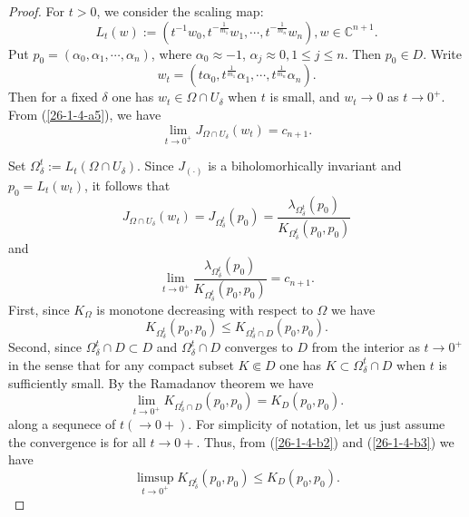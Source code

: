 \documentclass[a4paper,centertags,oneside,12pt]{amsart}
\numberwithin{equation}{section}
\begin{document}
\begin{proof}
For $t>0$, we consider the scaling map:
\begin{equation*}
    L_t(w):=(t^{-1}w_0, t^{-\frac{1}{m_1}}w_1, \cdots, t^{-\frac{1}{m_n}}w_n), w\in\mathbb C^{n+1}.
\end{equation*}
Put $p_0=(\alpha_0, \alpha_1, \cdots, \alpha_n)$, where $\alpha_0\approx -1$, $\alpha_j\approx 0, 1\leq j\leq n$. Then $p_0\in D$. Write 
$$w_t=(t\alpha_0, t^{\frac{1}{m_1}}\alpha_1, \cdots, t^{\frac{1}{m_n}}\alpha_n).$$
Then for a 
fixed $\delta$ one has $w_t\in \Omega\cap U_{\delta}$ when $t$ is small, and $w_t\rightarrow 0$ as $t\rightarrow 0^{+} $. From (\ref{26-1-4-a5}), we have
\begin{equation}\label{26-1-4-b1}
    \lim_{t\rightarrow 0^{+}}J_{\Omega\cap U_\delta}(w_t)=c_{n+1}.
\end{equation}


Set $\Omega^t_{\delta}:=L_t(\Omega\cap U_{\delta})$. Since $J_{(\cdot)}$ is a biholomorhically invariant and $p_0=L_t(w_t)$, it follows that 
\begin{equation*}\label{26-1-4-a10}
    J_{\Omega\cap U_{\delta}}(w_t)=J_{\Omega^t_\delta}(p_0)=\frac{\lambda_{\Omega^t_\delta}(p_0)}{K_{\Omega^t_\delta}(p_0,   p_0)}
\end{equation*}
and
\begin{equation*}
    \lim_{t\rightarrow0^{+}}\frac{\lambda_{\Omega_\delta^t}(p_0)}{K_{\Omega_\delta^t}(p_0, p_0)}=c_{n+1}.
\end{equation*}
First, since $K_{\Omega}$ is monotone decreasing with respect to $\Omega$ we have 
\begin{equation}\label{26-1-4-b2}
    K_{\Omega^t_\delta}(p_0,  p_0)\leq K_{\Omega^t_\delta\cap D}(p_0,  p_0).
\end{equation}
Second, since $\Omega^t_\delta\cap D\subset D$ and $\Omega^t_\delta\cap D$ converges to $D$ from the interior  as $t\rightarrow 0^+$ in the sense that for any compact subset $K\Subset D$ one has $K\subset \Omega^t_\delta\cap D$ when $t$ is sufficiently small.  By  the Ramadanov theorem \cite{James} we have
\begin{equation}\label{26-1-4-b3}
    \lim_{t\rightarrow 0^+}K_{\Omega^t_\delta\cap D}(p_0,  p_0)=K_{D}(p_0,  p_0).
\end{equation}
along  a sequnece of $t(\rightarrow 0+)$. For simplicity of notation, let us just assume the convergence is for all $t\rightarrow 0+$.
Thus, from (\ref{26-1-4-b2}) and (\ref{26-1-4-b3}) we have
\begin{equation}\label{26-1-4-a3}
    \limsup_{t\rightarrow 0^+} K_{\Omega^t_\delta}(p_0,  p_0)\leq K_{D}(p_0,  p_0).
\end{equation}


\end{proof}
\end{document}
